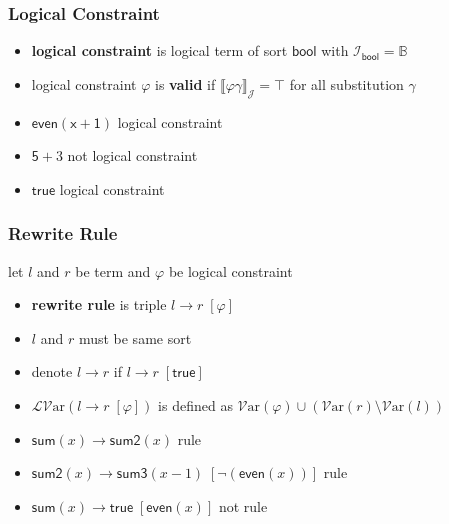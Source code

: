 \documentclass[12pt,aspectratio=169]{beamer}
\newcommand{\m}[1]{\mathsf{#1}}
\newcommand{\Var}{\mathcal{V}\mathrm{ar}}
\newcommand{\LVar}{\mathcal{LV}\mathrm{ar}}
\newcommand{\JJ}{\mathcal{J}}
\begin{document}
\begin{frame}
    \frametitle{Logical Constraint}
    \begin{definition}
        \begin{itemize}
        \item \textbf{logical constraint} is logical term of sort $\m{bool}$ with $\mathcal{I}_{\m{bool}} = \mathbb{B}$
        \item logical constraint $\varphi$ is \textbf{valid} if $\llbracket \varphi\gamma \rrbracket_\JJ = \top$ for all substitution $\gamma$
        \end{itemize}
    \end{definition}
    \begin{example}
        \begin{itemize}
            \item $\m{even}(\m{x} + \m{1})$ logical constraint
            \item $\m{5} + {3}$ not logical constraint
            \item $\m{true}$ logical constraint
        \end{itemize}
    \end{example}

\end{frame}

\begin{frame}
    \frametitle{Rewrite Rule}
    \begin{definition}
        let $l$ and $r$ be term and $\varphi$ be logical constraint
        \begin{itemize}
            \item \textbf{rewrite rule} is triple $l \to r \; [\varphi]$
            \item $l$ and $r$ must be same sort
            \item denote $l \to r$ if $l \to r \; [\m{true}]$
            \item $\LVar(l \to r \; [\varphi])$ is defined as $\Var(\varphi) \cup (\Var(r) \setminus \Var(l))$
        \end{itemize}
    \end{definition}
    \begin{itemize}
        \item $\m{sum}(x) \to \m{sum2}(x)$ rule
        \item $\m{sum2}(x) \to \m{sum3}(x-1) \; [\neg(\m{even}(x))]$ rule
        \item $\m{sum}(x) \to \m{true} \; [\m{even}(x)]$ not rule
    \end{itemize}
\end{frame}
\end{document}
